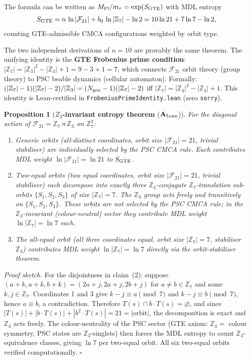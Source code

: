 \documentclass[11pt]{article}
\newtheorem{proposition}[theorem]{Proposition}
\theoremstyle{remark}
\newcommand{\ZS}{\mathbb{Z}_7}
\newcommand{\ZZ}{\mathbb{Z}}
\newcommand{\lean}[1]{%
  \penalty-100
  \begingroup\def\_{\textunderscore\allowbreak}\texttt{#1}\endgroup}
\newcommand{\FTT}{\mathcal{F}_{21}}
\newcommand{\CatAL}{\ensuremath{\textbf{A}_{\rm Lean}}}
\begin{document}
The formula can be written as $M_{\rm Pl}/m_\tau = \exp(S_{\rm GTE})$ with
MDL entropy
\begin{equation}
  S_{\rm GTE} = n\,\ln|\FTT| + b_0\,\ln|\ZS| - \ln 2
  = 10\ln 21 + 7\ln 7 - \ln 2,
\end{equation}
counting GTE-admissible CMCA configurations weighted by orbit type.

The two independent derivations of $n=10$ are provably the same theorem.
The unifying identity is the \textbf{GTE Frobenius prime condition}:
$|\ZS| = |\ZZ_3|^2 - |\ZZ_3| + 1 = 9 - 3 + 1 = 7$,
which connects $\FTT$ orbit theory (group theory) to PSC beable dynamics
(cellular automaton).
Formally: $(|\ZS|-1)(|\ZS|-2)/|\ZZ_3| = (N_{\rm gen}-1)(|\ZS|-2)$ iff
$|\ZS| = |\ZZ_3|^2-|\ZZ_3|+1$.
This identity is Lean-certified in \lean{FrobeniusPrimeIdentity.lean}
(zero \texttt{sorry}).

\begin{proposition}[\textbf{$Z_3$-invariant entropy theorem} ($\CatAL$)]
\label{prop:orbit_weight}
For the diagonal action of $\FTT = \ZS \rtimes \ZZ_3$ on $\ZS^3$:
\begin{enumerate}[noitemsep]
\item \emph{Generic orbits} (all-distinct coordinates, orbit size $|\FTT|=21$,
  trivial stabiliser) are individually selected by the PSC CMCA rule.
  Each contributes MDL weight $\ln|\FTT| = \ln 21$ to $S_{\rm GTE}$.
\item \emph{Two-equal orbits} (two equal coordinates, orbit size $|\FTT|=21$,
  trivial stabiliser) each decompose into exactly three $\ZZ_3$-conjugate
  $\ZS$-translation sub-orbits $\{S_1, S_2, S_3\}$ of size $|\ZS|=7$.
  The $\ZZ_3$ group acts freely and transitively on $\{S_1, S_2, S_3\}$.
  These orbits are \emph{not} selected by the PSC CMCA rule; in the
  $\ZZ_3$-invariant (colour-neutral) sector they contribute MDL weight
  $\ln|\ZS| = \ln 7$ each.
\item \emph{The all-equal orbit} (all three coordinates equal, orbit size
  $|\ZS|=7$, stabiliser $\ZZ_3$) contributes MDL weight $\ln|\ZS| = \ln 7$
  directly via the orbit-stabiliser theorem.
\end{enumerate}
\end{proposition}

\noindent
\emph{Proof sketch.}
For the disjointness in claim~(2): suppose $(a+k, a+k, b+k) = (2a+j, 2a+j, 2b+j)$
for $a \neq b \in \ZS$ and some $k, j \in \ZS$.  Coordinates 1 and 3 give
$k - j \equiv a \pmod{7}$ and $k - j \equiv b \pmod{7}$, hence $a \equiv b$,
a contradiction.  Therefore $T(s) \cap b \cdot T(s) = \varnothing$, and since
$|T(s)| + |b \cdot T(s)| + |b^2 \cdot T(s)| = 21 = |\text{orbit}|$, the
decomposition is exact and $\ZZ_3$ acts freely.  The colour-neutrality of the
PSC sector (GTE axiom: $\ZZ_3 =$ colour symmetry, PSC states are $\ZZ_3$-singlets)
then forces the MDL entropy to count $\ZZ_3$-equivalence classes, giving
$\ln 7$ per two-equal orbit.  All six two-equal orbits verified computationally.
\hfill$\square$
\end{document}
